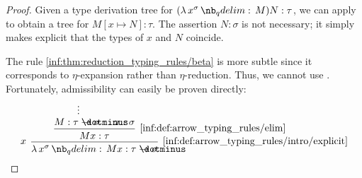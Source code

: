 \begin{proof}
  Given a type derivation tree for \( (\qabs {x^\sigma} M) N: \tau \), we can apply  to obtain a tree for \( M[x \mapsto N]: \tau \). The assertion \( N: \sigma \) is not necessary; it simply makes explicit that the types of \( x \) and \( N \) coincide.

  The rule \ref{inf:thm:reduction_typing_rules/beta} is more subtle since it corresponds to \( \eta \)-expansion rather than \( \eta \)-reduction. Thus, we cannot use . Fortunately, admissibility can easily be proven directly:
  \begin{equation*}
    \begin{prooftree}
      \hypo{}
      \ellipsis {} { M: \tau \synimplies \sigma }
      \hypo{ x: \sigma }

      \infer2[\ref{inf:def:arrow_typing_rules/elim}]{ Mx: \tau }

      \infer[left label=\( x \)]1[\ref{inf:def:arrow_typing_rules/intro/explicit}]{ \qabs {x^\sigma} Mx: \tau \synimplies \sigma }
    \end{prooftree}
  \end{equation*}
\end{proof}

